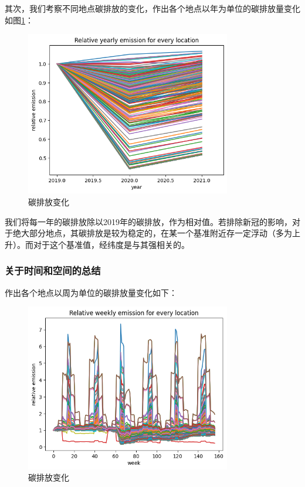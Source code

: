 \documentclass{ctexart}
\begin{document}
其次，我们考察不同地点碳排放的变化，作出各个地点以年为单位的碳排放量变化如图\ref{fig:5}：

\begin{figure}[H]
      \centering
      \includegraphics[width=0.8\textwidth]{output5.png}
      \caption{\label{fig:5}碳排放变化}
\end{figure}

我们将每一年的碳排放除以2019年的碳排放，作为相对值。若排除新冠的影响，对于绝大部分地点，其碳排放是较为稳定的，在某一个基准附近存一定浮动（多为上升）。而对于这个基准值，经纬度是与其强相关的。

\subsubsection{关于时间和空间的总结}

作出各个地点以周为单位的碳排放量变化如下：

\begin{figure}[H]
      \centering
      \includegraphics[width=0.8\textwidth]{output6.png}
      \caption{碳排放变化}
\end{figure}
\end{document}
